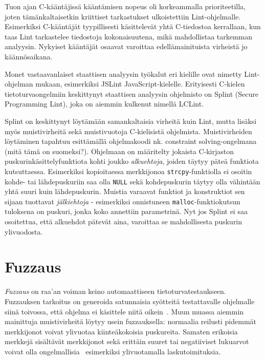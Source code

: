 Tuon ajan C-kääntäjissä kääntämisen nopeus oli korkeammalla prioriteetilla,
joten tämänkaltaisetkin kriittiset tarkastukset ulkoistettiin Lint-ohjelmalle.
Esimerkiksi C-kääntäjät tyypillisesti käsittelevät yhtä C-tiedostoa kerrallaan,
kun taas Lint tarkastelee tiedostoja kokonaisuutena,
mikä mahdollistaa tarkemman analyysin.
Nykyiset kääntäjät osaavat varoittaa edellämainituista virheistä jo käännösaikana.

Monet vastaavanlaiset staattisen analyysin työkalut eri kielille ovat nimetty
Lint-ohjelman mukaan, esimerkiksi JSLint JavaScript-kielelle.
Erityisesti C-kielen tietoturvaongelmiin keskittynyt staattisen analyysin ohjelmisto on Splint
(Secure Programming Lint), joka on aiemmin kulkenut nimellä LCLint.

Splint on keskittynyt löytämään samankaltaisia virheitä kuin Lint,
mutta lisäksi myös muistivirheitä sekä muistivuotoja C-kielisistä ohjelmista.
Muistivirheiden löytäminen tapahtuu esittämällä ohjelmakoodi nk. constraint solving-ongelmana
(mitä tämä on suomeksi?).
Ohjelmaan on määritelty jokaista C-kirjaston puskurinkäsittelyfunktiota kohti joukko
\emph{alkuehtoja}, joiden täytyy päteä funktiota kutsuttaessa.
Esimerkiksi kopioitaessa merkkijonoa \texttt{strcpy}-funktiolla ei osoitin kohde- tai lähdepuskuriin
saa olla \texttt{NULL} sekä kohdepuskurin täytyy olla vähintään yhtä suuri kuin lähdepuskurin.
Muistia varaavat funktiot ja konstruktiot sen sijaan tuottavat \emph{jälkiehtoja} -
esimerkiksi onnistuneen \texttt{malloc}-funktiokutsun tuloksena on puskuri, jonka
koko annettiin parametrinä.
Nyt jos Splint ei saa osoitettua, että alkuehdot pätevät aina,
varoittaa se mahdollisesta puskurin ylivuodosta.

\section{Fuzzaus}

\emph{Fuzzaus} on raa'an voiman keino automaattiseen tietoturvatestaukseen.
Fuzzauksen tarkoitus on generoida satunnaisia syötteitä testattavalle ohjelmalle siinä toivossa,
että ohjelma ei käsittele niitä oikein~\cite{UnixReliability}.
Muun muassa aiemmin mainittuja muistivirheitä löytyy usein fuzzauksella:
normaalia reilusti pidemmät merkkijonot voivat ylivuotaa kiinteäkokoisia puskureita.
Samaten erikoisia merkkejä sisältävät merkkijonot sekä erittäin suuret tai negatiiviset lukuarvot
voivat olla ongelmallisia~\cite{ViolatingAssumptions}
esimerkiksi ylivuotamalla laskutoimituksia.

